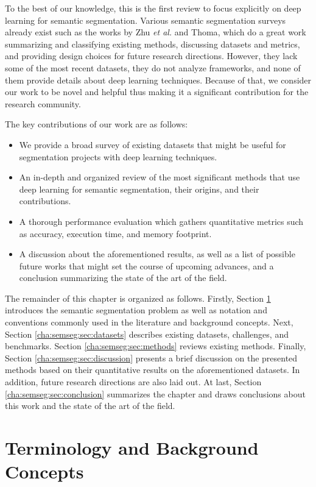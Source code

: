 To the best of our knowledge, this is the first review to focus explicitly on deep learning for semantic segmentation. Various semantic segmentation surveys already exist such as the works by Zhu \emph{et al.}\cite{Zhu2016} and Thoma\cite{Thoma2016}, which do a great work summarizing and classifying existing methods, discussing datasets and metrics, and providing design choices for future research directions. However, they lack some of the most recent datasets, they do not analyze frameworks, and none of them provide details about deep learning techniques. Because of that, we consider our work to be novel and helpful thus making it a significant contribution for the research community.

The key contributions of our work are as follows:

\begin{itemize}
	\item We provide a broad survey of existing datasets that might be useful for segmentation projects with deep learning techniques.
	\item An in-depth and organized review of the most significant methods that use deep learning for semantic segmentation, their origins, and their contributions.
	\item A thorough performance evaluation which gathers quantitative metrics such as accuracy, execution time, and memory footprint.
	\item A discussion about the aforementioned results, as well as a list of possible future works that might set the course of upcoming advances, and a conclusion summarizing the state of the art of the field.
\end{itemize}

The remainder of this chapter is organized as follows. Firstly, Section \ref{cha:semseg:sec:background} introduces the semantic segmentation problem as well as notation and conventions commonly used in the literature and background concepts. Next, Section \ref{cha:semseg:sec:datasets} describes existing datasets, challenges, and benchmarks. Section \ref{cha:semseg:sec:methods} reviews existing methods. Finally, Section \ref{cha:semseg:sec:discussion} presents a brief discussion on the presented methods based on their quantitative results on the aforementioned datasets. In addition, future research directions are also laid out. At last, Section \ref{cha:semseg:sec:conclusion} summarizes the chapter and draws conclusions about this work and the state of the art of the field.

\section{Terminology and Background Concepts}
\label{cha:semseg:sec:background}

